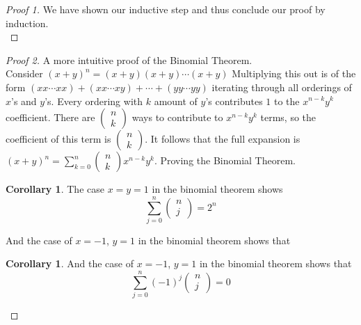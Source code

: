 \documentclass[11pt]{article}
\theoremstyle{definition}
\newtheorem{corollary}[theorem]{Corollary}
\begin{document}
\begin{proof}[Proof 1]
We have shown our inductive step and thus conclude our proof by induction.\\
\end{proof}
\begin{proof}[Proof 2] A more intuitive proof of the Binomial Theorem.\\
    Consider ${(x+y)}^n=(x+y)(x+y)\cdots(x+y)$ Multiplying this out is of
    the form $(xx\cdots xx) + (xx\cdots xy) + \cdots + (yy \cdots yy)$
    iterating through all orderings of $x$'s and $y$'s. Every ordering with
    $k$ amount of $y$'s contributes $1$ to the $x^{n-k}y^k$ coefficient.
    There are $(\begin{smallmatrix} n \\ k \end{smallmatrix})$ ways to
    contribute to $x^{n-k}y^k$ terms, so the coefficient of this term is $(\begin{smallmatrix} n \\ k \end{smallmatrix})$. It follows that the full expansion is 
        $(x+y)^n = \sum_{k=0}^n
        (\begin{smallmatrix} n \\ k \end{smallmatrix})x^{n-k}y^k$. Proving the Binomial Theorem.
\begin{corollary}
The case $x=y=1$ in the binomial theorem shows
\begin{equation*}
    \sum\limits_{j=0}^n \begin{pmatrix} n \\ j \end{pmatrix}=2^n
\end{equation*}
\end{corollary}
And the case of $x=-1$, $y=1$ in the binomial theorem shows that
\begin{corollary}
And the case of $x=-1$, $y=1$ in the binomial theorem shows that
\begin{equation*}
\sum\limits_{j=0}^n (-1)^j \begin{pmatrix} n \\ j \end{pmatrix}=0
\end{equation*}
\end{corollary}
\end{proof}
\end{document}
